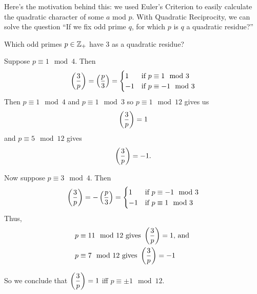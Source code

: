 Here's the motivation behind this: we used Euler's Criterion to easily calculate the quadratic character of some $a$ mod $p$. With Quadratic Reciprocity, we can solve the question ``If we fix odd prime $q$, for which $p$ is $q$ a quadratic residue?''

\begin{example}
    Which odd primes $p\in\mathbb Z_+$ have $3$ as a quadratic residue?

    Suppose $p\equiv 1\mod 4$. Then
    \[\left(\dfrac{3}{p}\right) = \left(\dfrac{p}{3}\right) = \begin{cases}
            1  & \text{if $p\equiv 1\mod 3$}  \\
            -1 & \text{if $p\equiv -1\mod 3$}
        \end{cases}\]
    Then $p\equiv 1\mod 4$ and $p\equiv 1\mod 3$ so $p\equiv 1\mod 12$ gives us \[\left(\dfrac{3}{p}\right) = 1\] and $p\equiv 5\mod 12$ gives \[\left(\dfrac{3}{p}\right) = -1.\]

    Now suppose $p\equiv 3\mod 4$. Then
    \[\left(\dfrac{3}{p}\right) = -\left(\dfrac{p}{3}\right) = \begin{cases}
            1  & \text{if $p\equiv -1\mod 3$} \\
            -1 & \text{if $p\equiv 1\mod 3$}
        \end{cases}\]
    Thus,
    \begin{align*}
        p & \equiv 11\mod 12\text{ gives }\left(\dfrac{3}{p}\right) = 1\text{, and } \\
        p & \equiv 7\mod 12\text{ gives }\left(\dfrac{3}{p}\right) = -1
    \end{align*}

    So we conclude that $\left(\dfrac{3}{p}\right) = 1$ iff $p\equiv \pm 1\mod 12$.
\end{example}